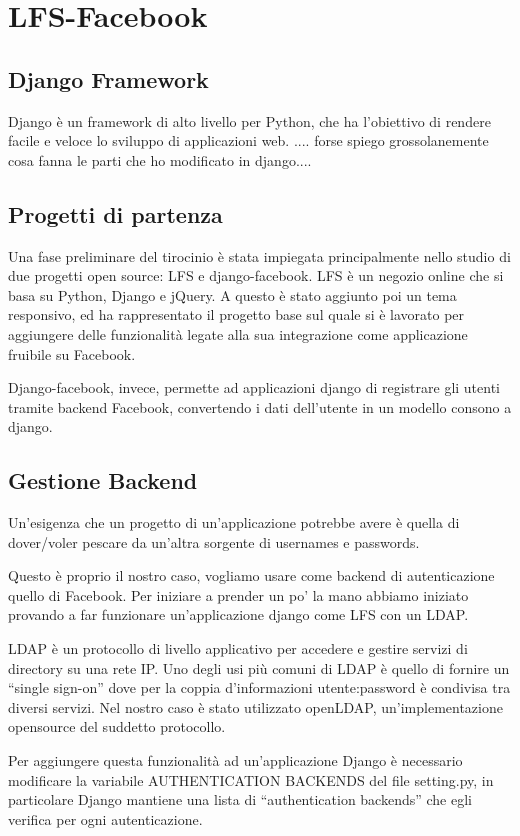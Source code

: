 \chapter{LFS-Facebook}

\section{Django Framework}
Django è un framework di alto livello per Python, che ha l'obiettivo di rendere facile e veloce lo sviluppo di applicazioni web.
.... forse spiego grossolanemente cosa fanna le parti che ho modificato in django....
 
\section{Progetti di partenza}
Una fase preliminare del tirocinio è stata impiegata principalmente nello studio di due progetti open source: LFS e django-facebook.
LFS è un negozio online che  si basa su Python, Django e jQuery. A questo è stato aggiunto poi un tema responsivo, ed ha rappresentato il progetto base sul quale si è lavorato per aggiungere delle funzionalità legate alla sua integrazione come applicazione fruibile su Facebook. 

Django-facebook, invece, permette ad applicazioni django di registrare gli utenti tramite backend Facebook, convertendo i dati dell'utente in un modello consono a django.

\section{Gestione Backend}
Un'esigenza che un progetto di un'applicazione potrebbe avere è quella di dover/voler pescare da un'altra sorgente di usernames e passwords.

Questo è proprio il nostro caso, vogliamo usare come backend di autenticazione quello di Facebook.
Per iniziare a prender un po' la mano abbiamo iniziato provando a far funzionare un'applicazione django come LFS con un LDAP. 

LDAP è un protocollo di livello applicativo per accedere e gestire servizi di directory su una rete IP. Uno degli usi più comuni di LDAP è quello di fornire un “single sign-on” dove per la coppia d'informazioni utente:password è condivisa tra diversi servizi.
Nel nostro caso è stato utilizzato openLDAP, un'implementazione opensource del suddetto protocollo.


Per aggiungere questa funzionalità ad un'applicazione Django è necessario modificare la variabile AUTHENTICATION BACKENDS del file setting.py, in particolare Django mantiene una lista di “authentication backends” che egli verifica per ogni autenticazione. 

